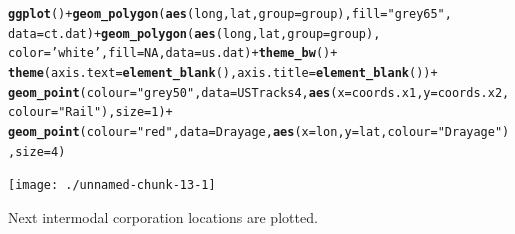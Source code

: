 \documentclass{article}\usepackage[]{graphicx}\usepackage[]{color}
\makeatletter
\newcommand{\hlnum}[1]{\textcolor[rgb]{0.686,0.059,0.569}{#1}}%
\newcommand{\hlstr}[1]{\textcolor[rgb]{0.192,0.494,0.8}{#1}}%
\newcommand{\hlopt}[1]{\textcolor[rgb]{0,0,0}{#1}}%
\newcommand{\hlstd}[1]{\textcolor[rgb]{0.345,0.345,0.345}{#1}}%
\newcommand{\hlkwc}[1]{\textcolor[rgb]{0.333,0.667,0.333}{#1}}%
\newcommand{\hlkwd}[1]{\textcolor[rgb]{0.737,0.353,0.396}{\textbf{#1}}}%
\newenvironment{kframe}{%
 \def\at@end@of@kframe{}%
 \ifinner\ifhmode%
  \def\at@end@of@kframe{\end{minipage}}%
  \begin{minipage}{\columnwidth}%
 \fi\fi%
 \def\FrameCommand##1{\hskip\@totalleftmargin \hskip-\fboxsep
 \colorbox{shadecolor}{##1}\hskip-\fboxsep
     \hskip-\linewidth \hskip-\@totalleftmargin \hskip\columnwidth}%
 \MakeFramed {\advance\hsize-\width
   \@totalleftmargin\z@ \linewidth\hsize
   \@setminipage}}%
 {\par\unskip\endMakeFramed%
 \at@end@of@kframe}
\newenvironment{knitrout}{}{} %
\makeatother
\begin{document}
\begin{knitrout}
\color{fgcolor}\begin{kframe}
\begin{alltt}
\hlkwd{ggplot}\hlstd{()} \hlopt{+} \hlkwd{geom_polygon}\hlstd{(}\hlkwd{aes}\hlstd{(long,lat,} \hlkwc{group}\hlstd{=group),} \hlkwc{fill}\hlstd{=}\hlstr{"grey65"}\hlstd{,}
  \hlkwc{data}\hlstd{=ct.dat)} \hlopt{+} \hlkwd{geom_polygon}\hlstd{(}\hlkwd{aes}\hlstd{(long,lat,} \hlkwc{group}\hlstd{=group),}
  \hlkwc{color}\hlstd{=}\hlstr{'white'}\hlstd{,} \hlkwc{fill}\hlstd{=}\hlnum{NA}\hlstd{,} \hlkwc{data}\hlstd{=us.dat)} \hlopt{+} \hlkwd{theme_bw}\hlstd{()} \hlopt{+}
  \hlkwd{theme}\hlstd{(}\hlkwc{axis.text} \hlstd{=} \hlkwd{element_blank}\hlstd{(),} \hlkwc{axis.title}\hlstd{=}\hlkwd{element_blank}\hlstd{())} \hlopt{+}
  \hlkwd{geom_point}\hlstd{(}\hlkwc{colour}\hlstd{=}\hlstr{"grey50"}\hlstd{,}\hlkwc{data}\hlstd{=USTracks4,} \hlkwd{aes}\hlstd{(}\hlkwc{x}\hlstd{=coords.x1,}\hlkwc{y}\hlstd{=coords.x2,}\hlkwc{colour}\hlstd{=}\hlstr{"Rail"}\hlstd{),} \hlkwc{size} \hlstd{=} \hlnum{1}\hlstd{)} \hlopt{+}
  \hlkwd{geom_point}\hlstd{(}\hlkwc{colour}\hlstd{=}\hlstr{"red"}\hlstd{,}\hlkwc{data}\hlstd{=Drayage,} \hlkwd{aes}\hlstd{(}\hlkwc{x}\hlstd{=lon,}\hlkwc{y}\hlstd{=lat,}\hlkwc{colour}\hlstd{=}\hlstr{"Drayage"}\hlstd{),}\hlkwc{size} \hlstd{=} \hlnum{4}\hlstd{)}
\end{alltt}
\end{kframe}

{\centering \texttt{[image: ./unnamed-chunk-13-1]} 

}



\end{knitrout}
\newpage

Next intermodal corporation locations are plotted. \\
\end{document}
